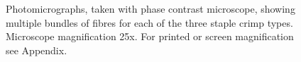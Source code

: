 %

\begin{figure}[!htp]
  \centering



 
  \caption{Photomicrographs, taken with phase contrast microscope, showing multiple bundles of fibres for each of the three staple crimp types. Microscope magnification 25x. For printed or screen magnification see Appendix.}
  \label{fig:fibre3types}

\end{figure}

%

